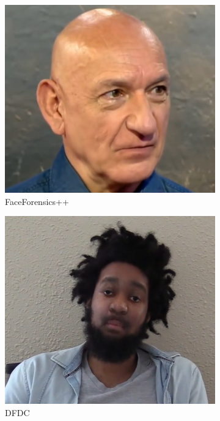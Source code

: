 \begin{figure}[htbp]
	\centering
	\begin{subfigure}{.45\textwidth}
		\centering
		\includegraphics[width=.8\linewidth]{figures/method1}
		\caption{FaceForensics++}\label{fig:sub1}
	\end{subfigure}%
	\hspace{-5mm}
	\begin{subfigure}{.45\textwidth}
		\centering
		\includegraphics[width=.8\linewidth]{figures/method2}
		\caption{DFDC}\label{fig:sub2}
	\end{subfigure}
	\vspace{5mm} %
	\begin{subfigure}{.45\textwidth}
		\centering

\end{subfigure}
\end{figure}
